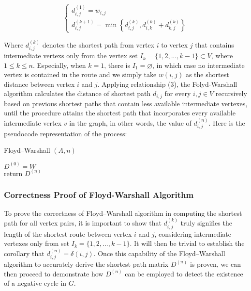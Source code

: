\documentclass[12pt]{article}
\begin{document}
\begin{equation}
\begin{cases}
    d^{(1)}_{i,j} = w_{i,j} \\
    d^{(k+1)}_{i,j} = \min \left\{ d^{(k)}_{i,j}, d^{(k)}_{i,k} + d^{(k)}_{k,j} \right\} \label{s}
\end{cases}
\end{equation}

Where $d^{(k)}_{i,j}$ denotes the shortest path from vertex $i$ to vertex $j$ that contains intermediate vertexs only from the vertex set $I_k = \{1,2,...,k-1\} \subset V$, where $1 \le k \le n$. Especially, when $k = 1$, there is $I_1 = \varnothing$, in which case no intermediate vertex is contained in the route and we simply take $w(i, j)$ as the shortest distance between vertex $i$ and $j$. Applying relationship (3), the Folyd-Warshall algorithm calculates the distance of shortest path $d_{i,j}$ for every $i, j \in V$ recursively based on previous shortest paths that contain less available intermediate vertexes, until the procedure attains the shortest path that incorporates every available intermediate vertex $v$ in the graph, in other words, the value of $d^{(n)}_{i,j}$. Here is the pseudocode representation of the process:

\begin{algorithm}[H]
    \SetAlgoLined
    \caption{Floyd–Warshall $(A, n)$}
    $D^{(0)} = W$\\
    return $D^{(n)}$
    \end{algorithm}

\subsubsection{Correctness Proof of Floyd-Warshall Algorithm}

To prove the correctness of Floyd–Warshall algorithm in computing the shortest path for all vertex pairs, it is important to show that $d^{(k)}_{i,j}$ truly signifies the length of the shortest route between vertex $i$ and $j$, considering intermediate vertexes only from set $I_k = \{1,2,...,k-1\}$. It will then be trivial to establish the corollary that $d^{(n)}_{i,j} = \delta(i, j)$. Once this capability of the Floyd–Warshall algorithm to accurately derive the shortest path matrix $D^{(n)}$ is proven, we can then proceed to demonstrate how $D^{(n)}$ can be employed to detect the existence of a negative cycle in $G$.
\end{document}
